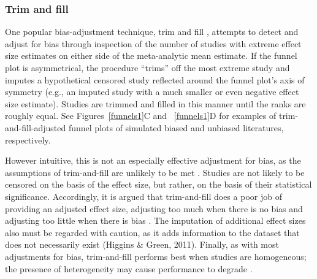\documentclass[man, mask]{apa6}
\begin{document}
\subsubsection{Trim and fill}
One popular bias-adjustment technique, trim and fill \citep{Duval:Tweedie:2000}, attempts to detect and adjust for bias through inspection of the number of studies with extreme effect size estimates on either side of the meta-analytic mean estimate. If the funnel plot is asymmetrical, the procedure ``trims'' off the most extreme study and imputes a hypothetical censored study reflected around the funnel plot's axis of symmetry (e.g., an imputed study with a much smaller or even negative effect size estimate). Studies are trimmed and filled in this manner until the ranks are roughly equal. See Figures~\ref{funnels1}C and ~\ref{funnels1}D for examples of trim-and-fill-adjusted funnel plots of simulated biased and unbiased literatures, respectively. 

However intuitive, this is not an especially effective adjustment for bias, as the assumptions of trim-and-fill are unlikely to be met \citep{Simonsohn:etal:2014b}. Studies are not likely to be censored on the basis of the effect size, but rather, on the basis of their statistical significance. Accordingly, it is argued that trim-and-fill does a poor job of providing an adjusted effect size, adjusting too much when there is no bias and adjusting too little when there is bias \citep{Simonsohn:etal:2014b}. %
The imputation of additional effect sizes also must be regarded with caution, as it adds information to the dataset that does not necessarily exist (Higgins \& Green, 2011). Finally, as with most adjustments for bias, trim-and-fill performs best when studies are homogeneous; the presence of heterogeneity may cause performance to degrade \citep{Terrin:etal:2003}.
\nocite{Higgins:Green:2011}
\end{document}
